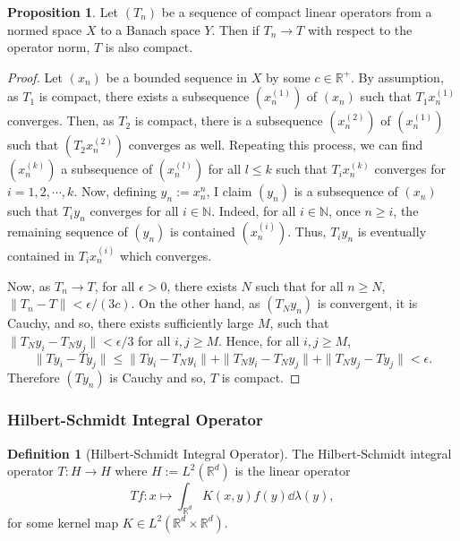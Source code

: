 \documentclass[]{article}
\theoremstyle{definition}
\theoremstyle{definition}
\newtheorem{definition}{Definition}[section]
\newtheorem{proposition}{Proposition}[section]
\begin{document}
\begin{proposition}
  Let \((T_n)\) be a sequence of compact linear operators from a normed space 
  \(X\) to a Banach space \(Y\). Then if \(T_n \to T\) with respect to the 
  operator norm, \(T\) is also compact.
\end{proposition}
\begin{proof}
  Let \((x_n)\) be a bounded sequence in \(X\) by some \(c \in \mathbb{R}^+\). 
  By assumption, as \(T_1\) is compact, there exists a subsequence 
  \((x_n^{(1)})\) of \((x_n)\) such that \(T_1 x_n^{(1)}\) converges. Then, 
  as \(T_2\) is compact, there is a subsequence \((x_n^{(2)})\) of \((x_n^{(1)})\)
  such that \((T_2x_n^{(2)})\) converges as well. Repeating this process, we 
  can find \((x_n^{(k)})\) a subsequence of \((x_n^{(l)})\) for all \(l \le k\) 
  such that \(T_i x_n^{(k)}\) converges for \(i = 1, 2, \cdots, k\). Now, defining 
  \(y_n := x_n^n\), I claim \((y_n)\) is a subsequence of \((x_n)\) such that 
  \(T_i y_n\) converges for all \(i \in \mathbb{N}\). Indeed, for all 
  \(i \in \mathbb{N}\), once \(n \ge i\), the remaining sequence of \((y_n)\) 
  is contained \((x_n^{(i)})\). Thus, \(T_i y_n\) is eventually contained in 
  \(T_i x_n^{(i)}\) which converges.

  Now, as \(T_n \to T\), for all \(\epsilon > 0\), there exists \(N\) such that 
  for all \(n \ge N\), \(\|T_n - T\| < \epsilon / (3c)\). On the other hand, 
  as \((T_N y_n)\) is convergent, it is Cauchy, and so, there exists 
  sufficiently large \(M\), such that \(\|T_N y_i - T_N y_j\| < \epsilon / 3\) 
  for all \(i, j \ge M\). Hence, for all \(i, j \ge M\),
  \[\|Ty_i - Ty_j\| \le \|Ty_i - T_N y_i\| + \|T_N y_i - T_N y_j\| + 
    \|T_N y_j - Ty_j\| < \epsilon.\]
  Therefore \((Ty_n)\) is Cauchy and so, \(T\) is compact.
\end{proof}

\subsubsection{Hilbert-Schmidt Integral Operator}

\begin{definition}[Hilbert-Schmidt Integral Operator]
  The Hilbert-Schmidt integral operator \(T : H \to H\) where 
  \(H := L^2(\mathbb{R}^d)\) is the linear operator 
  \[Tf : x \mapsto \int_{\mathbb{R}^d} K(x, y) f(y) \dd \lambda(y),\]
  for some kernel map \(K \in L^2(\mathbb{R}^d \times \mathbb{R}^d)\).
\end{definition}
\end{document}
